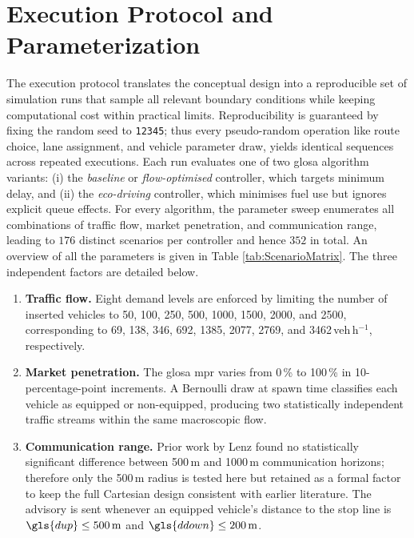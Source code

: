 \section{Execution Protocol and Parameterization}
\label{sec:exec_protocol}

The execution protocol translates the conceptual design into a reproducible set of simulation runs that sample all relevant boundary conditions while keeping computational cost within practical limits. Reproducibility is guaranteed by fixing the random seed to \texttt{12345}; thus every pseudo-random operation like route choice, lane assignment, and vehicle parameter draw, yields identical sequences across repeated executions. Each run evaluates one of two \ac{glosa} algorithm variants: (i) the \emph{baseline} or \emph{flow-optimised} controller, which targets minimum delay, and (ii) the \emph{eco-driving} controller, which minimises fuel use but ignores explicit queue effects. For every algorithm, the parameter sweep enumerates all combinations of traffic flow, market penetration, and communication range, leading to $176$ distinct scenarios per controller and hence $352$ in total. An overview of all the parameters is given in Table \ref{tab:ScenarioMatrix}. The three independent factors are detailed below.  

\begin{enumerate}
\item \textbf{Traffic flow.} Eight demand levels are enforced by limiting the number of inserted vehicles to 50, 100, 250, 500, 1000, 1500, 2000, and 2500, corresponding to 69, 138, 346, 692, 1385, 2077, 2769, and 3462\,veh\,h\(^{-1}\), respectively.  
\item \textbf{Market penetration.} The \ac{glosa} \ac{mpr} varies from 0\,\% to 100\,\% in 10-percentage-point increments. A Bernoulli draw at spawn time classifies each vehicle as equipped or non-equipped, producing two statistically independent traffic streams within the same macroscopic flow.
\item \textbf{Communication range.} Prior work by Lenz \cite{Lenz2024} found no statistically significant difference between 500\,m and 1000\,m communication horizons; therefore only the 500\,m radius is tested here but retained as a formal factor to keep the full Cartesian design consistent with earlier literature. The advisory is sent whenever an equipped vehicle’s distance to the stop line is $\gls{dup}\leq500\,\mathrm{m}$ and $\gls{ddown}\leq200\,\mathrm{m}$.
\end{enumerate}

